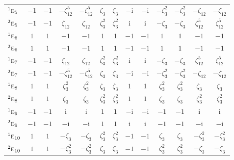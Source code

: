 \documentclass[10pt,a4paper]{article}
\numberwithin{equation}{section}
\newcommand{\irr}[1]{\text{\normalfont\scshape #1}}
\newcommand{\conjpair}[1]{{}^{#1}}
\newcommand{\iunit}{\mathrm{i}}
\newcommand{\rootunity}[1]{\zeta_{#1}}
\begin{document}
{\begin{longtable}{@{}lcccccccccccc@{}}
$\conjpair{1}\irr{e}_{5}$ & $-1$ & $-1$ & $-\rootunity{12}^{5}$ & $-\rootunity{12}^{5}$ & $\rootunity{3}$ & $\rootunity{3}$ & $-\iunit{}$ & $-\iunit{}$ & $-\rootunity{3}^{2}$ & $-\rootunity{3}^{2}$ & $-\rootunity{12}$ & $-\rootunity{12}$\\
$\conjpair{2}\irr{e}_{5}$ & $-1$ & $-1$ & $\rootunity{12}$ & $\rootunity{12}$ & $\rootunity{3}^{2}$ & $\rootunity{3}^{2}$ & $\iunit{}$ & $\iunit{}$ & $-\rootunity{3}$ & $-\rootunity{3}$ & $\rootunity{12}^{5}$ & $\rootunity{12}^{5}$\\
$\conjpair{1}\irr{e}_{6}$ & $1$ & $1$ & $-1$ & $-1$ & $1$ & $1$ & $-1$ & $-1$ & $1$ & $1$ & $-1$ & $-1$\\
$\conjpair{2}\irr{e}_{6}$ & $1$ & $1$ & $-1$ & $-1$ & $1$ & $1$ & $-1$ & $-1$ & $1$ & $1$ & $-1$ & $-1$\\
$\conjpair{1}\irr{e}_{7}$ & $-1$ & $-1$ & $\rootunity{12}$ & $\rootunity{12}$ & $\rootunity{3}^{2}$ & $\rootunity{3}^{2}$ & $\iunit{}$ & $\iunit{}$ & $-\rootunity{3}$ & $-\rootunity{3}$ & $\rootunity{12}^{5}$ & $\rootunity{12}^{5}$\\
$\conjpair{2}\irr{e}_{7}$ & $-1$ & $-1$ & $-\rootunity{12}^{5}$ & $-\rootunity{12}^{5}$ & $\rootunity{3}$ & $\rootunity{3}$ & $-\iunit{}$ & $-\iunit{}$ & $-\rootunity{3}^{2}$ & $-\rootunity{3}^{2}$ & $-\rootunity{12}$ & $-\rootunity{12}$\\
$\conjpair{1}\irr{e}_{8}$ & $1$ & $1$ & $\rootunity{3}^{2}$ & $\rootunity{3}^{2}$ & $\rootunity{3}$ & $\rootunity{3}$ & $1$ & $1$ & $\rootunity{3}^{2}$ & $\rootunity{3}^{2}$ & $\rootunity{3}$ & $\rootunity{3}$\\
$\conjpair{2}\irr{e}_{8}$ & $1$ & $1$ & $\rootunity{3}$ & $\rootunity{3}$ & $\rootunity{3}^{2}$ & $\rootunity{3}^{2}$ & $1$ & $1$ & $\rootunity{3}$ & $\rootunity{3}$ & $\rootunity{3}^{2}$ & $\rootunity{3}^{2}$\\
$\conjpair{1}\irr{e}_{9}$ & $-1$ & $-1$ & $\iunit{}$ & $\iunit{}$ & $1$ & $1$ & $-\iunit{}$ & $-\iunit{}$ & $-1$ & $-1$ & $\iunit{}$ & $\iunit{}$\\
$\conjpair{2}\irr{e}_{9}$ & $-1$ & $-1$ & $-\iunit{}$ & $-\iunit{}$ & $1$ & $1$ & $\iunit{}$ & $\iunit{}$ & $-1$ & $-1$ & $-\iunit{}$ & $-\iunit{}$\\
$\conjpair{1}\irr{e}_{10}$ & $1$ & $1$ & $-\rootunity{3}$ & $-\rootunity{3}$ & $\rootunity{3}^{2}$ & $\rootunity{3}^{2}$ & $-1$ & $-1$ & $\rootunity{3}$ & $\rootunity{3}$ & $-\rootunity{3}^{2}$ & $-\rootunity{3}^{2}$\\
$\conjpair{2}\irr{e}_{10}$ & $1$ & $1$ & $-\rootunity{3}^{2}$ & $-\rootunity{3}^{2}$ & $\rootunity{3}$ & $\rootunity{3}$ & $-1$ & $-1$ & $\rootunity{3}^{2}$ & $\rootunity{3}^{2}$ & $-\rootunity{3}$ & $-\rootunity{3}$\\

\end{longtable}}
\end{document}
